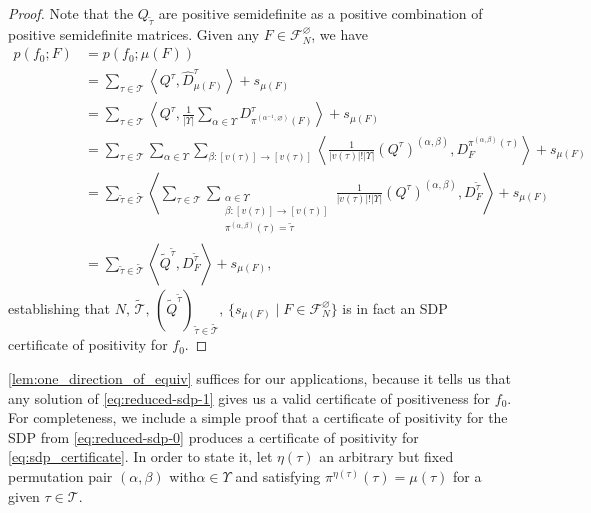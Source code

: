 \documentclass[a4paper,11pt]{article}
\numberwithin{equation}{section}
\newcommand{\mF}{\mathcal{F}}
\newcommand{\mT}{\mathcal{T}}
\begin{document}
\begin{proof}
    Note that the $Q_{\tilde{\tau}}$ are positive semidefinite as a positive combination of positive semidefinite matrices. Given any $F \in \mF_N^\varnothing$, we have
    \begin{align*}
        p(f_0;F) &= p(f_0;\mu(F)) \\
        &= \sum_{\tau \in \mT}\left\langle Q^{\tau}, \hat{D}_{\mu(F) }^{\tau } \right\rangle + s_{ \mu(F) } \\
        &= \sum_{\tau \in \mT}\left\langle Q^{\tau}, \frac{1}{|\Upsilon|}\sum_{\alpha\in\Upsilon}D_{\pi^{(\alpha^{-1},\varnothing)}(F)}^{\tau } \right\rangle + s_{ \mu(F) } \\
        &= \sum_{\tau \in \mT}\sum_{\alpha\in\Upsilon}
        \sum_{\beta:[v(\tau)]\to [v(\tau)]}
        \left\langle \frac{1}{|v(\tau)|!|\Upsilon|} (Q^{\tau})^{(\alpha,\beta)}, D_{F}^{\pi^{(\alpha,\beta)}(\tau)} \right\rangle + s_{ \mu(F) } \\
       &= \sum_{\tilde\tau\in\tilde{\mT}} \left\langle \sum_{\tau\in \mT} \sum_{\substack{\alpha \in \Upsilon \\ \beta:[v(\tau)]\to [v(\tau)] \\ \pi^{(\alpha,\beta)}(\tau) = \tilde\tau}}
        \frac{1}{|v(\tau)|!|\Upsilon|} (Q^{\tau})^{(\alpha,\beta)}, D_{F}^{\tilde\tau} \right\rangle + s_{ \mu(F) } \\
        &= \sum_{\tilde\tau\in\tilde{\mT}} \left\langle \tilde{Q}^{\tilde{\tau}}, D_{F}^{\tilde\tau} \right\rangle + s_{ \mu(F) },
    \end{align*}
    establishing that $N, \, \tilde{\mT}, \, (\tilde{Q}^{\tilde{\tau}} )_{\tilde {\tau} \in \tilde{\mT}}, \, \{ s_{\mu(F)} \mid F \in \mF_N^\varnothing \}$ is in fact an SDP certificate of positivity for $f_0$.
\end{proof}

\cref{lem:one_direction_of_equiv} suffices for our applications, because it tells us that any solution of  \cref{eq:reduced-sdp-1} gives us a valid certificate of positiveness for $f_0$. For completeness, we include a simple proof that a certificate of positivity for the SDP from \cref{eq:reduced-sdp-0} produces a certificate of positivity for \cref{eq:sdp_certificate}. In order to state it, let $\eta(\tau)$ an arbitrary but fixed permutation pair $(\alpha,\beta)$ with$\alpha\in\Upsilon$ and satisfying $\pi^{\eta(\tau)}(\tau) = \mu(\tau)$ for a given $\tau\in \mT$.
\end{document}

